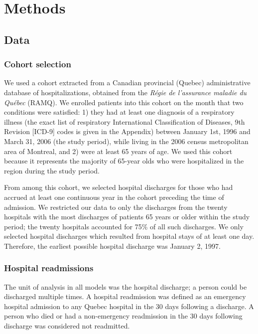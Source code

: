 \documentclass[]{article}\usepackage[]{graphicx}\usepackage[]{color}
\begin{document}


\section{Methods}

\subsection{Data}

\subsubsection{Cohort selection}
We used a cohort extracted from a Canadian provincial (Quebec) administrative database of hospitalizations, obtained from the \emph{Régie de l'assurance maladie du Québec} (RAMQ). We enrolled patients into this cohort on the month that two conditions were satisfied: 1) they had at least one diagnosis of a respiratory illness (the exact list of respiratory International Classification of Diseases, 9th Revision [ICD-9] codes is given in the Appendix) between January 1st, 1996 and March 31, 2006 (the study period), while living in the 2006 census metropolitan area of Montreal, and 2) were at least 65 years of age. We used this cohort because it represents the majority of 65-year olds who were hospitalized in the region during the study period. 

From among this cohort, we selected hospital discharges for those who had accrued at least one continuous year in the cohort preceding the time of admission. We restricted our data to only the discharges from the twenty hospitals with the most discharges of patients 65 years or older within the study period; the twenty hospitals accounted for 75\% of all such discharges.  We only selected hospital discharges which resulted from hospital stays of at least one day. Therefore, the earliest possible hospital discharge was January 2, 1997.

\subsubsection{Hospital readmissions}
The unit of analysis in all models was the hospital discharge; a person could be discharged multiple times. A hospital readmission was defined as an emergency hospital admission to any Quebec hospital in the 30 days following a discharge.  A person who died or had a non-emergency readmission in the 30 days following discharge was considered not readmitted.
\end{document}
